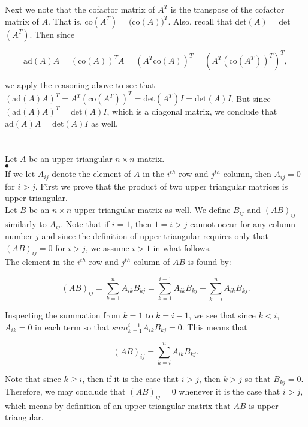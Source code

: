 \documentclass[11pt]{article}
\begin{document}
Next we note that the cofactor matrix of $A^T$ is the transpose of the cofactor matrix of $A$. That is, co$(A^T) = ($co$(A))^T$. Also, recall that det$(A) = $det$(A^T)$. Then since

$$\text{ad}(A)A = (\text{co}(A))^TA = (A^T\text{co}(A))^T = (A^T(\text{co}(A^T))^T)^T,$$ 

we apply the reasoning above to see that $(\text{ad}(A)A)^T = A^T(\text{co}(A^T))^T = \text{det}(A^T)I = \text{det}(A)I$. But since $(\text{ad}(A)A)^T = \text{det}(A)I$, which is a diagonal matrix, we conclude that $\text{ad}(A)A = \text{det}(A)I$ as well.

\section{}

Let $A$ be an upper triangular $n \times n$ matrix.\\

$\bullet$\\

If we let $A_{ij}$ denote the element of $A$ in the $i^{th}$ row and $j^{th}$ column, then $A_{ij} = 0$ for $i > j$. First we prove that the product of two upper triangular matrices is upper triangular.\\

Let $B$ be an $n \times n$ upper triangular matrix as well. We define $B_{ij}$ and $(AB)_{ij}$ similarly to $A_{ij}$. Note that if $i = 1$, then $1=i>j$ cannot occur for any column number $j$ and since the definition of upper triangular requires only that $(AB)_{ij} = 0$ for $i>j$, we assume $i > 1$ in what follows.\\

The element in the $i^{th}$ row and $j^{th}$ column of $AB$ is found by:

$$(AB)_{ij} = \sum_{k=1}^n A_{ik}B_{kj} = \sum_{k=1}^{i-1} A_{ik}B_{kj} + \sum_{k = i}^n A_{ik}B_{kj}. $$

Inspecting the summation from $k=1$ to $k = i-1$, we see that since $k<i$, $A_{ik} = 0$ in each term so that $sum_{k=1}^{i-1} A_{ik}B_{kj} = 0$. This means that

$$(AB)_{ij} = \sum_{k = i}^n A_{ik}B_{kj}. $$

Note that since $k\geq i$, then if it is the case that $i > j$, then $k > j$ so that $B_{kj} = 0$. Therefore, we may conclude that $(AB)_{ij} = 0$ whenever it is the case that $i > j$, which means by definition of an upper triangular matrix that $AB$ is upper triangular. \\
\end{document}
